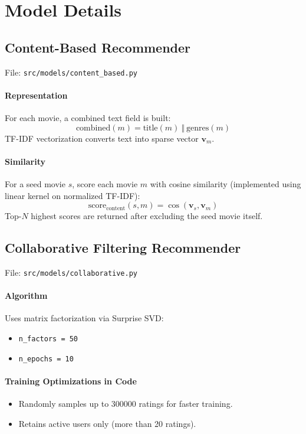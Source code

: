 \documentclass[11pt,a4paper]{article}
\begin{document}
\section{Model Details}
\subsection{Content-Based Recommender}
File: \texttt{src/models/content\_based.py}

\paragraph{Representation}
For each movie, a combined text field is built:
\begin{equation}
\text{combined}(m) = \text{title}(m) ~\Vert~ \text{genres}(m)
\end{equation}
TF-IDF vectorization converts text into sparse vector $\mathbf{v}_m$.

\paragraph{Similarity}
For a seed movie $s$, score each movie $m$ with cosine similarity (implemented using linear kernel on normalized TF-IDF):
\begin{equation}
\text{score}_{\text{content}}(s,m) = \cos(\mathbf{v}_s, \mathbf{v}_m)
\end{equation}
Top-$N$ highest scores are returned after excluding the seed movie itself.

\subsection{Collaborative Filtering Recommender}
File: \texttt{src/models/collaborative.py}

\paragraph{Algorithm}
Uses matrix factorization via Surprise SVD:
\begin{itemize}[leftmargin=1.5em]
    \item \texttt{n\_factors = 50}
    \item \texttt{n\_epochs = 10}
\end{itemize}

\paragraph{Training Optimizations in Code}
\begin{itemize}[leftmargin=1.5em]
    \item Randomly samples up to 300000 ratings for faster training.
    \item Retains active users only (more than 20 ratings).
\end{itemize}
\end{document}
